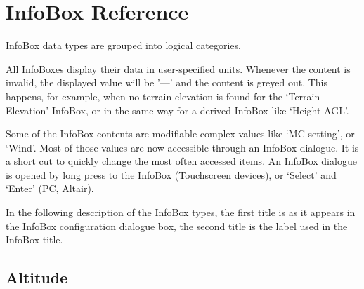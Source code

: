 \chapter{InfoBox Reference}\label{cha:infobox}
InfoBox data types are grouped into logical categories.

All InfoBoxes display their data in user-specified units.  Whenever the content
is invalid, the displayed value will be '---' and the content is
greyed out.  This happens, for example, when no terrain elevation is found for
the `Terrain Elevation' InfoBox, or in the same way for a derived InfoBox like
`Height AGL'.

Some of the InfoBox contents are modifiable complex values like `MC setting', or `Wind'. Most of
those values are now accessible through an InfoBox dialogue. It is a short cut to quickly
change the most often accessed items. An InfoBox dialogue is opened by long press to the InfoBox
(Touchscreen devices), or `Select' and `Enter' (PC, Altair).

In the following description of the InfoBox types, the first
title is as it appears in the InfoBox configuration dialogue box, the
second title is the label used in the InfoBox title.

\newcommand{\ibi}[3]{%
\jindent{
\begin{tabular}{r}
{\bf #1} \\
\infobox{{#2}} \\
\end{tabular}}{#3}
}
\newcommand{\ibig}[4]{%
\jindent{
\begin{tabular}{r}
{\bf #1} \\
\infobox{{#2}} \\
\texttt{[image: \#4]} \\
\end{tabular}}{#3}
}


\section{Altitude}

